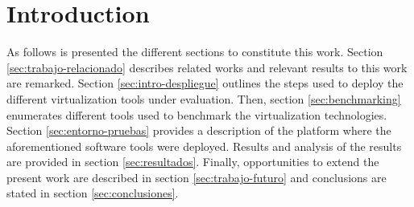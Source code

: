 \section{Introduction}
As follows is presented the different sections to constitute this work.
Section \ref{sec:trabajo-relacionado} describes related works and relevant results to this work are remarked. 
Section \ref{sec:intro-despliegue} outlines the steps used to deploy the different virtualization tools under evaluation.
Then, section \ref{sec:benchmarking} enumerates different tools used to benchmark the virtualization technologies. 
Section \ref{sec:entorno-pruebas} provides a description of the platform where the aforementioned software tools were deployed.
Results and analysis of the results are provided in section \ref{sec:resultados}. 
Finally, opportunities to extend the present work are described in section \ref{sec:trabajo-futuro} and conclusions are stated in section \ref{sec:conclusiones}.  

